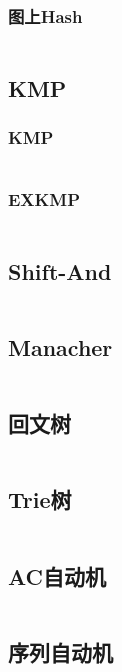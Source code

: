 \documentclass[a4paper,11pt]{article}
\begin{document}
\subsubsection{图上Hash}
\inputminted[breaklines]{c++}{字符串/图上Hash.cpp} 

\subsection{KMP} 
\subsubsection{KMP} 
\inputminted[breaklines]{c++}{字符串/KMP.cpp} 
\subsubsection{EXKMP}
\inputminted[breaklines]{c++}{字符串/EXKMP.cpp} 

\subsection{Shift-And}
\inputminted[breaklines]{c++}{字符串/Shift-And.cpp} 


\subsection{Manacher}
\inputminted[breaklines]{c++}{字符串/Manacher.cpp} 

\subsection{回文树}
\inputminted[breaklines]{c++}{字符串/回文树.cpp} 

\subsection{Trie树}
\inputminted[breaklines]{c++}{字符串/Trie树.cpp} 

\subsection{AC自动机}
\inputminted[breaklines]{c++}{字符串/AC自动机.cpp} 

\subsection{序列自动机}
\inputminted[breaklines]{c++}{字符串/序列自动机.cpp} 
\end{document}

